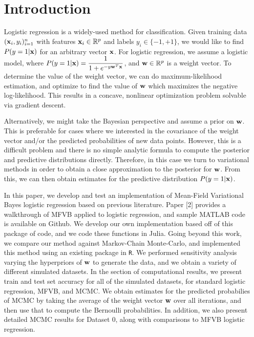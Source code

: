 
\section{Introduction}\label{sec:intro}

Logistic regression is a widely-used method for classification.  Given training data $(\boldsymbol{\mathbf{x}}_i, y_i)_{i=1}^n$ with features $\boldsymbol{\mathbf{x}}_i \in \mathbb{R}^p$ and labels $y_i \in \{-1,+1\}$, we would like to find $P(y = 1 | \boldsymbol{\mathbf{x}})$ for an arbitrary vector $\boldsymbol{\mathbf{x}}$.  For logistic regression, we assume a logistic model, where $P(y = 1 | \boldsymbol{\mathbf{x}}) = \dfrac{1}{1 + e^{-y\boldsymbol{\mathbf{w}}^T\boldsymbol{\mathbf{x}}}}$, and $\boldsymbol{\mathbf{w}} \in \mathbb{R}^p$ is a weight vector.  To determine the value of the weight vector, we can do maximum-likelihood estimation, and optimize to find the value of $\boldsymbol{\mathbf{w}}$ which maximizes the negative log-likelihood.  This results in a concave, nonlinear optimization problem solvable via gradient descent.

Alternatively, we might take the Bayesian perspective and assume a prior on $\boldsymbol{\mathbf{w}}$.  This is preferable for cases where we interested in the covariance of the weight vector and/or the predicted probabilities of new data points.   However, this is a difficult problem and there is no simple analytic formula to compute the posterior and predictive distributions directly.  Therefore, in this case we turn to variational methods in order to obtain a close approximation to the posterior for $\boldsymbol{\mathbf{w}}$.  From this, we can then obtain estimates for the predictive distribution $P(y = 1 | \boldsymbol{\mathbf{x}})$.  

In this paper, we develop and test an implementation of Mean-Field Variational Bayes logistic regression based on previous literature.  Paper [2] provides a walkthrough of MFVB applied to logistic regression, and sample MATLAB code is available on Github.  We develop our own implementation based off of this package of code, and we code these functions in Julia. Going beyond this work, we compare our method against Markov-Chain Monte-Carlo, and implemented this method using an existing package in \texttt{R}.  We performed sensitivity analysis varying the hyperpriors of $\boldsymbol{\mathbf{w}}$ to generate the data, and we obtain a variety of different simulated datasets.  In the section of computational results, we present train and test set accuracy for all of the simulated datasets, for standard logistic regression, MFVB, and MCMC.  We obtain estimates for the predicted probabilies of MCMC by taking the average of the weight vector $\boldsymbol{\mathbf{w}}$ over all iterations, and then use that to compute the Bernoulli probabilities.  In addition, we also present detailed MCMC results for Dataset 0, along with comparisons to MFVB logistic regression.   
